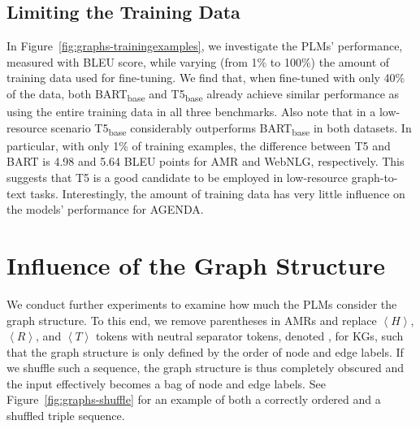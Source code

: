 \documentclass[11pt,a4paper]{article}
\newcommand{\ourtag}[1]{\ensuremath{\left\langle #1 \right\rangle}}
\newcommand{\sep}{}
\begin{document}
\begin{table*}[t]
\subsection{Limiting the Training Data}

In Figure~\ref{fig:graphs-trainingexamples}, we investigate the PLMs' performance, measured with BLEU score, while varying (from 1\% to 100\%) the amount of training data used for fine-tuning. We find that, when fine-tuned with only 40\% of the data, both BART\textsubscript{base} and T5\textsubscript{base} already achieve similar performance as using the entire training data in all three benchmarks. Also note that in a low-resource scenario T5\textsubscript{base} considerably outperforms BART\textsubscript{base} in both datasets. In particular, with only 1\% of training examples, the difference between T5 and BART is 4.98 and 5.64 BLEU points for AMR and WebNLG, respectively. This suggests that T5 is a good candidate to be employed in low-resource graph-to-text tasks. Interestingly, the amount of training data has very little influence on the models' performance for AGENDA.






















\section{Influence of the Graph Structure}


We conduct further experiments to examine how much the PLMs consider the graph structure.
To this end, we remove parentheses in AMRs and replace \ourtag{H}, \ourtag{R}, and \ourtag{T} tokens with neutral separator tokens, denoted \sep{}, for KGs, such that the graph structure is only defined by the order of node and edge labels.
If we shuffle such a sequence,
the graph structure is thus completely obscured and the input effectively becomes a bag of node and edge labels.
See Figure~\ref{fig:graphs-shuffle} for an example of both a correctly ordered and a shuffled triple sequence.


\begin{table}[t]
\centering
{\renewcommand{\arraystretch}{0.6}

}
\end{table}
\end{table*}
\end{document}
